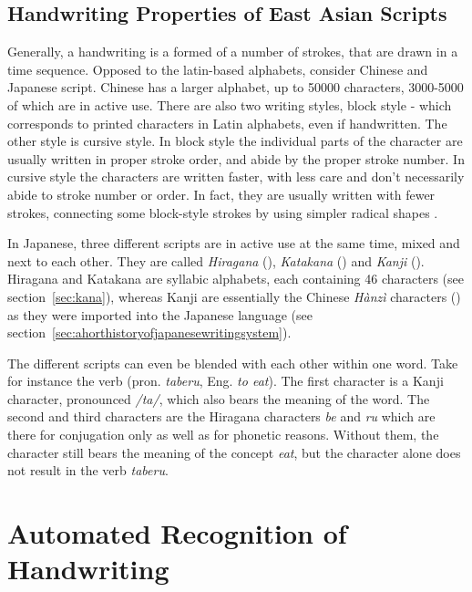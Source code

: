 \subsection{Handwriting Properties of East Asian Scripts}
\label{sec:handwritingpropertieseastasian}

Generally, a handwriting is a formed of a number of strokes, that are drawn
in a time sequence. Opposed to the latin-based alphabets, consider Chinese and
Japanese script. Chinese has a larger alphabet, up to 50000 characters, 
3000-5000 of which are in active use. There are also two writing styles,
block style - which corresponds to printed characters in Latin alphabets,
even if handwritten. The other style is cursive style. In block style the
individual parts of the character are usually written in proper stroke order,
and abide by the proper stroke number. In cursive style the characters are
written faster, with less care and don't necessarily abide to stroke
number or order. In fact, they are usually written with fewer strokes,
connecting some block-style strokes by using simpler radical 
shapes .

In Japanese, three different scripts are in active use at the same time,
mixed and next to each other. They are called \emph{Hiragana} (), 
\emph{Katakana} () and \emph{Kanji} ().
Hiragana and Katakana are syllabic alphabets, each containing 46 characters
(see section~\ref{sec:kana}), whereas Kanji are essentially the Chinese 
\emph{Hànzì} characters () as they were imported into the Japanese 
language (see section~\ref{sec:ahorthistoryofjapanesewritingsystem}).

The different scripts can even be blended with each other within one word. 
Take for instance the verb  (pron. \emph{taberu}, 
Eng. \emph{to eat}). 
The first character is a Kanji character, pronounced \emph{/ta/}, 
which also bears the meaning of the word. The second and third characters 
are the Hiragana characters \emph{be} and \emph{ru} which are there for 
conjugation only as well as for phonetic reasons. 
Without them, the character  still bears the meaning of the concept 
\emph{eat}, but the character alone does not result in the verb \emph{taberu}.

\section{Automated Recognition of Handwriting}
\label{sec:autorecoofhandwriting}

